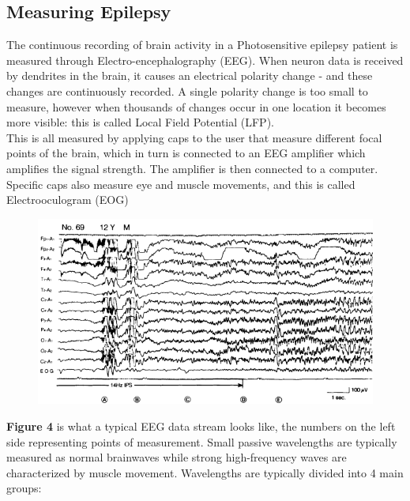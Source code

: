 \documentclass[twocolumn, 10pt, conference]{ieeetran}
\begin{document}
\subsection{Measuring Epilepsy}
The continuous recording of brain activity in a Photosensitive epilepsy patient is measured through Electro-encephalography (EEG). When neuron data is received by dendrites in the brain, it causes an electrical polarity change - and these changes are continuously recorded. A single polarity change is too small to measure, however when thousands of changes occur in one location it becomes more visible: this is called Local Field Potential (LFP).\\
This is all measured by applying caps to the user that measure different focal points of the brain, which in turn is connected to an EEG amplifier which amplifies the signal strength. The amplifier is then connected to a computer. Specific caps also measure eye and muscle movements, and this is called Electrooculogram (EOG)
\begin{figure}[h!]
	\centering
	\includegraphics[width=1\linewidth]{"Figure 3"}
	\caption{}
	\label{Figure 4:EEG Reading}
\end{figure}
\textbf{Figure 4} is what a typical EEG data stream looks like, the numbers on the left side representing points of measurement. Small passive wavelengths are typically measured as normal brainwaves while strong high-frequency waves are characterized by muscle movement. Wavelengths are typically divided into 4 main groups:
\\\\
\end{document}
